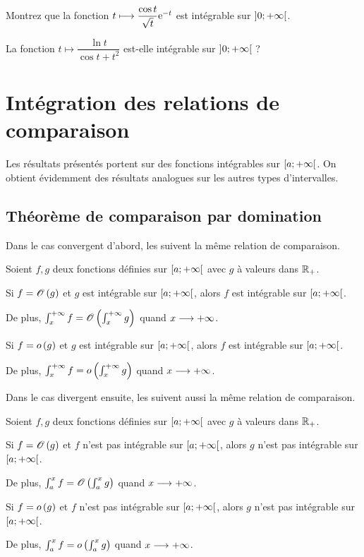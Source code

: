 \begin{exo}
Montrez que la fonction \(t\longmapsto\dfrac{\cos t}{\sqrt{t}}\mathrm{e}^{-t}\) est intégrable sur \(\left]0;+\infty\right[\).
\end{exo}

\begin{exo}
La fonction \(t\mapsto\dfrac{\ln t}{\cos t+t^2}\) est-elle intégrable sur \(\left]0;+\infty\right[\) ?
\end{exo}

\section{Intégration des relations de comparaison}

Les résultats présentés portent sur des fonctions intégrables sur \(\left[a;+\infty\right[\). On obtient évidemment des résultats analogues sur les autres types d'intervalles.

\subsection{Théorème de comparaison par domination}

Dans le cas convergent d'abord, les  suivent la même relation de comparaison.

\begin{theo}
Soient \(f,g\) deux fonctions définies sur \(\left[a;+\infty\right[\) avec \(g\) à valeurs dans \(\mathbb{R}_+\).

Si \(f=\mathscr{O}\left(g\right)\) et \(g\) est intégrable sur \(\left[a;+\infty\right[\), alors \(f\) est intégrable sur \(\left[a;+\infty\right[\).

De plus, \(\int_x^{+\infty}f=\mathscr{O}\left(\int_x^{+\infty}g\right)\) quand \(x\longrightarrow+\infty\).

Si \(f=o\left(g\right)\) et \(g\) est intégrable sur \(\left[a;+\infty\right[\), alors \(f\) est intégrable sur \(\left[a;+\infty\right[\).

De plus, \(\int_x^{+\infty}f=o\left(\int_x^{+\infty}g\right)\) quand \(x\longrightarrow+\infty\).
\end{theo}

Dans le cas divergent ensuite, les  suivent aussi la même relation de comparaison.

\begin{theo}
Soient \(f,g\) deux fonctions définies sur \(\left[a;+\infty\right[\) avec \(g\) à valeurs dans \(\mathbb{R}_+\).

Si \(f=\mathscr{O}\left(g\right)\) et \(f\) n'est pas intégrable sur \(\left[a;+\infty\right[\), alors \(g\) n'est pas intégrable sur \(\left[a;+\infty\right[\).

De plus, \(\int_a^xf=\mathscr{O}\left(\int_a^xg\right)\) quand \(x\longrightarrow+\infty\).

Si \(f=o\left(g\right)\) et \(f\) n'est pas intégrable sur \(\left[a;+\infty\right[\), alors \(g\) n'est pas intégrable sur \(\left[a;+\infty\right[\).

De plus, \(\int_a^xf=o\left(\int_a^xg\right)\) quand \(x\longrightarrow+\infty\).
\end{theo}

